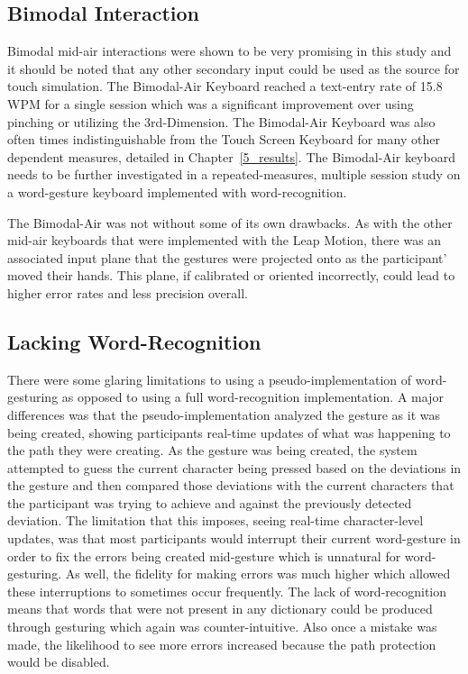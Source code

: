 \subsection{Bimodal Interaction}
Bimodal mid-air interactions were shown to be very promising in this study and it should be noted that any other secondary input could be used as the source for touch simulation. The Bimodal-Air Keyboard reached a text-entry rate of 15.8 WPM for a single session which was a significant improvement over using pinching or utilizing the 3rd-Dimension. The Bimodal-Air Keyboard was also often times indistinguishable from the Touch Screen Keyboard for many other dependent measures, detailed in Chapter~\ref{5_results}. The Bimodal-Air keyboard needs to be further investigated in a repeated-measures, multiple session study on a word-gesture keyboard implemented with word-recognition.

The Bimodal-Air was not without some of its own drawbacks. As with the other mid-air keyboards that were implemented with the Leap Motion, there was an associated input plane that the gestures were projected onto as the participant' moved their hands. This plane, if calibrated or oriented incorrectly, could lead to higher error rates and less precision overall.

\subsection{Lacking Word-Recognition}
There were some glaring limitations to using a pseudo-implementation of word-gesturing as opposed to using a full word-recognition implementation. A major differences was that the pseudo-implementation analyzed the gesture as it was being created, showing participants real-time updates of what was happening to the path they were creating. As the gesture was being created, the system attempted to guess the current character being pressed based on the deviations in the gesture and then compared those deviations with the current characters that the participant was trying to achieve and against the previously detected deviation. The limitation that this imposes, seeing real-time character-level updates, was that most participants would interrupt their current word-gesture in order to fix the errors being created mid-gesture which is unnatural for word-gesturing. As well, the fidelity for making errors was much higher which allowed these interruptions to sometimes occur frequently. The lack of word-recognition means that words that were not present in any dictionary could be produced through gesturing which again was counter-intuitive. Also once a mistake was made, the likelihood to see more errors increased because the path protection would be disabled.


